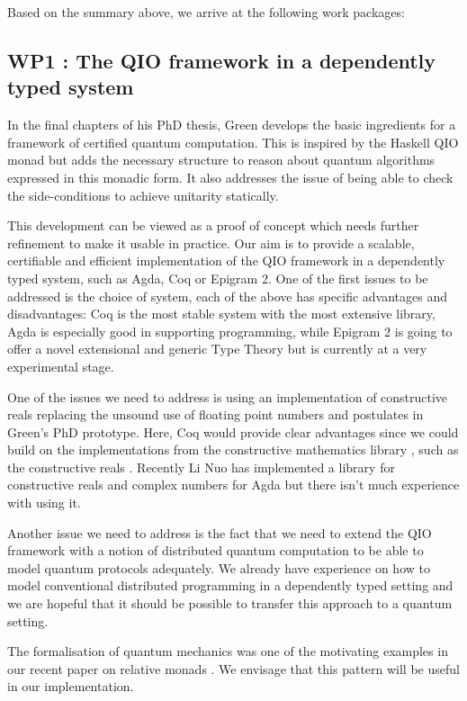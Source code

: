 \documentclass[a4paper]{article}
\begin{document}
Based on the summary above, we arrive at the following work packages:

\subsection*{WP1 : The QIO framework in a dependently typed system}
\label{sec:wp:qio}

In the final chapters of his PhD thesis, Green develops the basic
ingredients for a framework of certified quantum computation. This is
inspired by the Haskell QIO monad but adds the necessary structure to
reason about quantum algorithms expressed in this monadic form. It
also addresses the issue of being able to check the side-conditions to
achieve unitarity statically.

This development can be viewed as a proof of concept which needs
further refinement to make it usable in practice. Our aim is to
provide a scalable, certifiable and efficient implementation of the QIO
framework in a dependently typed system, such as Agda, Coq or Epigram
2.  One of the first issues to be addressed is the choice of system,
each of the above has specific advantages and disadvantages: Coq is
the most stable system with the most extensive library, Agda is
especially good in supporting programming, while Epigram 2 is going to
offer a novel extensional and generic Type Theory but is currently at
a very experimental stage.

One of the issues we need to address is using an implementation of
constructive reals replacing the unsound use of floating point numbers
and postulates in Green's PhD prototype. Here, Coq would provide clear
advantages since we could build on the implementations from the
constructive mathematics library , such as the constructive
reals . 
Recently Li Nuo has implemented a
library for constructive reals and complex numbers for Agda
but there isn't much experience with using it.

Another issue we need to address is the fact that we need to extend
the QIO framework with a notion of distributed quantum computation to be
able to model quantum protocols adequately. We already have experience
on how to model conventional distributed programming in a dependently
typed setting  and we are hopeful that it should be possible to
transfer this approach to a quantum setting.

The formalisation of quantum mechanics was one of the motivating
examples in our recent paper on relative monads .
We envisage that this pattern will be useful in our implementation.
\end{document}
